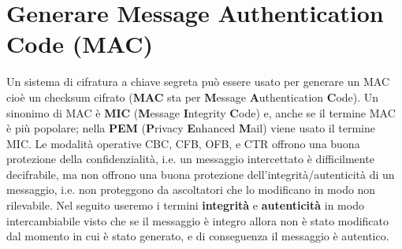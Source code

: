 \section{Generare Message Authentication Code (MAC)}
Un sistema di cifratura a chiave segreta può essere usato per generare un MAC cioè un checksum cifrato (\textbf{MAC} sta per \textbf{M}essage \textbf{A}uthentication \textbf{C}ode). Un sinonimo di MAC è \textbf{MIC} (\textbf{M}essage \textbf{I}ntegrity \textbf{C}ode) e, anche se il termine MAC è più popolare; nella \textbf{PEM} (\textbf{P}rivacy \textbf{E}nhanced \textbf{M}ail) viene usato il termine MIC.
\newline \newline
Le modalità operative CBC, CFB, OFB, e CTR offrono una buona protezione della confidenzialità, i.e. un messaggio intercettato è difficilmente decifrabile, ma non offrono una buona protezione dell'integrità/autenticità di un messaggio, i.e. non proteggono da ascoltatori che lo modificano in modo non rilevabile.
\newline \newline
Nel seguito useremo i termini \textbf{integrità} e \textbf{autenticità} in modo intercambiabile visto che se il messaggio è integro allora non è stato modificato dal momento in cui è stato generato, e di conseguenza il messaggio è autentico.
